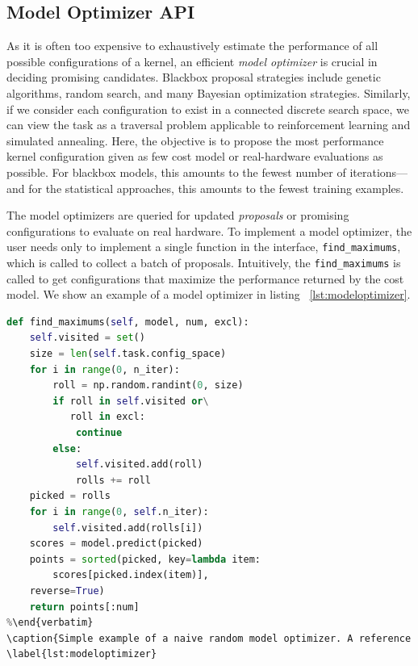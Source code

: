 \subsection{Model Optimizer API}
As it is often too expensive to exhaustively estimate the performance of all possible configurations of a  kernel, an efficient \emph{model optimizer} is crucial in deciding promising candidates.
Blackbox proposal strategies include genetic algorithms, random search, and many Bayesian optimization strategies.
Similarly, if we consider each configuration to exist in a connected discrete search space, we can view the task as a traversal problem applicable to reinforcement learning and simulated annealing.
Here, the objective is to propose the most performance kernel configuration given as few cost model or real-hardware evaluations as possible.
For blackbox models, this amounts to the fewest number of iterations---and for the statistical approaches, this amounts to the fewest training examples.

The model optimizers are queried for updated \emph{proposals} or promising configurations to evaluate on real hardware.
To implement a model optimizer, the user needs only to implement a single function in the interface, \texttt{find\_maximums}, which is called to collect a batch of proposals.
Intuitively, the \texttt{find\_maximums} is called to get configurations that maximize the performance returned by the cost model.
We show an example of a model optimizer in listing ~\autoref{lst:modeloptimizer}.
%
\begin{lstlisting}[language=Python]
def find_maximums(self, model, num, excl):
    self.visited = set()
    size = len(self.task.config_space)
    for i in range(0, n_iter):
        roll = np.random.randint(0, size)
        if roll in self.visited or\
           roll in excl:
            continue
        else:
            self.visited.add(roll)
            rolls += roll 
    picked = rolls
    for i in range(0, self.n_iter):
        self.visited.add(rolls[i])
    scores = model.predict(picked)
    points = sorted(picked, key=lambda item: 
        scores[picked.index(item)],
    reverse=True)
    return points[:num]
%\end{verbatim}
\caption{Simple example of a naive random model optimizer. A reference to a cost model is passed as \emph{model}, the number of proposals is specified with \emph{num}, and \emph{excl} contains a set of any points in the search space that should be excluded from consideration.}
\label{lst:modeloptimizer}
\end{lstlisting}


